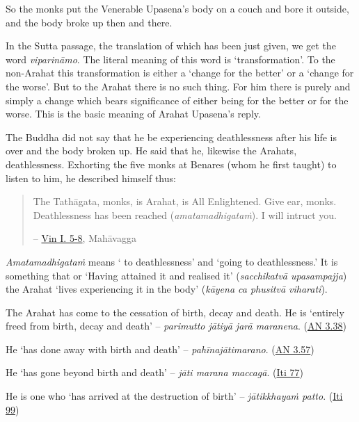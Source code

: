 So the monks put the Venerable Upasena's body on a couch and bore it outside, and the body broke up then and there.

In the Sutta passage, the translation of which has been just given, we get the word \emph{viparināmo}. The literal meaning of this word is `transformation'. To the non-Arahat this transformation is either a `change for the better' or a `change for the worse'. But to the Arahat there is no such thing. For him there is purely and simply a change which bears  significance of either being for the better or for the worse. This is the basic meaning of Arahat Upasena's reply.

The Buddha did not say that he  be experiencing deathlessness after his life is over and the body broken up. He said that he, likewise the Arahats,  deathlessness. Exhorting the five monks at Benares (whom he first taught) to listen to him, he described himself thus:

\begin{quote}
The Tathāgata, monks, is Arahat, is All Enlightened. Give ear, monks. Deathlessness has been reached (\emph{amatamadhigataṁ}). I will intruct you.

 -- \href{https://suttacentral.net/pli-tv-kd1/en/brahmali}{Vin I. 5-8}, Mahāvagga
\end{quote}

\emph{Amatamadhigataṁ} means ` to deathlessness' and  `going to deathlessness.' It is something that  or  `Having attained it and realised it' (\emph{sacchikatvā upasampajja}) the Arahat `lives experiencing it in the body' (\emph{kāyena ca phusitvā viharati}).

The Arahat has come to the cessation of birth, decay and death. He is `entirely freed from birth, decay and death' -- \emph{parimutto jātiyā jarā maranena}. (\href{https://suttacentral.net/an3.38/en/bodhi}{AN 3.38})

He `has done away with birth and death' -- \emph{pahīnajātimarano}. (\href{https://suttacentral.net/an3.57/en/bodhi}{AN 3.57})

He `has gone beyond birth and death' -- \emph{jāti marana maccagā}. (\href{https://suttacentral.net/iti77/en/sujato}{Iti 77})

He is one who `has arrived at the destruction of birth' -- \emph{jātikkhayaṁ patto}. (\href{https://suttacentral.net/iti99/en/sujato}{Iti 99})

